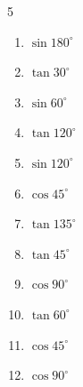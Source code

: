 \begin{multicols}{5}
\begin{enumerate}

  \item $\displaystyle \sin{180^\circ}$

        \phantom{$\displaystyle =0$}

  \item $\displaystyle \tan{30^\circ}$


  \item $\displaystyle \sin{60^\circ}$


  \item $\displaystyle \tan{120^\circ}$


  \item $\displaystyle \sin{120^\circ}$


  \item $\displaystyle \cos{45^\circ}$


  \item $\displaystyle \tan{135^\circ}$

        \phantom{$\displaystyle =-1$}

  \item $\displaystyle \tan{45^\circ}$

        \phantom{$\displaystyle =1$}

  \item $\displaystyle \cos{90^\circ}$

        \phantom{$\displaystyle =0$}

  \item $\displaystyle \tan{60^\circ}$


  \item $\displaystyle \cos{45^\circ}$


  \item $\displaystyle \cos{90^\circ}$

        \phantom{$\displaystyle =0$}

\columnbreak %


\end{enumerate}
\end{multicols}
